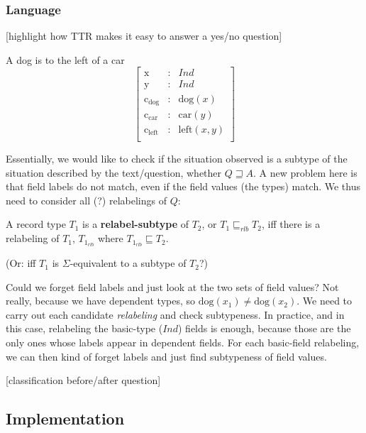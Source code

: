 \subsubsection{Language}

[highlight how TTR makes it easy to answer a yes/no question]

A dog is to the left of a car
\begin{equation}\left[\begin{array}{rcl}
\text{x} &:& Ind\\
\text{y} &:& Ind\\
\text{c}_\text{dog} &:& \text{dog}(x)\\
\text{c}_\text{car} &:& \text{car}(y)\\
\text{c}_\text{left} &:& \text{left}(x, y)\\
\end{array}\right]\end{equation}


Essentially, we would like to check if the situation observed is a subtype of the situation described by the text/question, whether $Q \sqsupseteq A$. A new problem here is that field labels do not match, even if the field values (the types) match. We thus need to consider all (?) relabelings of $Q$:

A record type $T_1$ is a \textbf{relabel-subtype} of $T_2$, or $T_1 \sqsubseteq_{rlb} T_2$,  iff there is a relabeling of $T_1$, $T_{1_{rlb}}$ where $T_{1_{rlb}} \sqsubseteq T_2$.

(Or: iff $T_1$ is $\Sigma$-equivalent to a subtype of $T_2$?)

Could we forget field labels and just look at the two sets of field values? Not really, because we have dependent types, so $\text{dog}(x_1) ≠ \text{dog}(x_2)$. We need to carry out each candidate \textit{relabeling} and check subtypeness. In practice, and in this case, relabeling the basic-type ($Ind$) fields is enough, because those are the only ones whose labels appear in dependent fields. For each basic-field relabeling, we can then kind of forget labels and just find subtypeness of field values.

[classification before/after question]



\subsection{Implementation}

